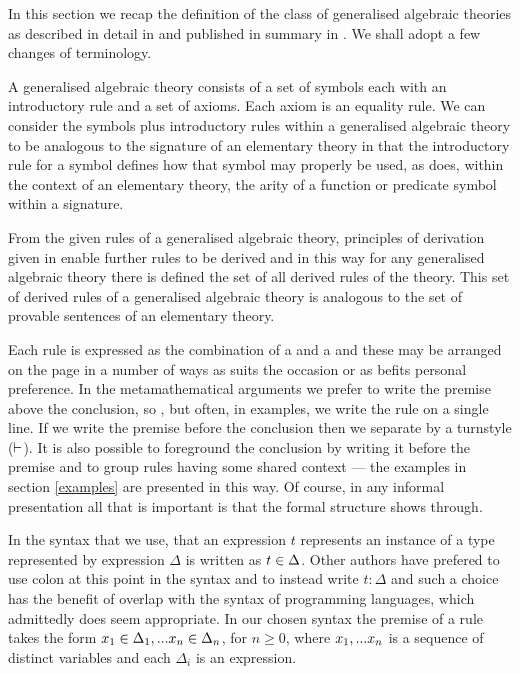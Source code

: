 \label{generalisedalgrbraictheories}

In this section we recap the definition  of the class of generalised algebraic theories 
as described in detail in \cite{Cartmell78}  and published in summary in \cite{Cartmell86}.
We shall adopt a few changes of terminology.

A generalised algebraic theory consists of a set of symbols each with an introductory rule and a set of axioms. 
Each axiom is an equality rule. We can consider the symbols plus introductory rules within a generalised algebraic theory to be analogous to the signature of an elementary theory in that
the introductory rule for a symbol defines how that symbol may properly be used, as does, within the context of an elementary theory, the arity of a function or predicate symbol within a signature.

From the given rules of a generalised algebraic theory, 
principles of derivation given in \cite{Cartmell86} enable further rules
to be derived and in this way for any generalised algebraic theory 
there is defined the set of all derived rules of the theory. 
This set of derived rules of a generalised algebraic theory is analogous to the set of provable sentences of an elementary theory.
  
Each rule is expressed as the combination of a   and a  
and these may be arranged on the page in a number of ways as suits the occasion or as befits personal preference. 
In the metamathematical arguments we prefer to write the premise above the conclusion, 
so , but often, in examples, we write  the rule on a single line. 
If we write the premise before the conclusion then we separate by a turnstyle ($\vdash$). 
It is also possible to foreground the conclusion by writing it before the premise and to group rules having some shared context --- the 
examples in section \ref{examples} are presented in this way.
Of course, in any informal presentation all that is important is that the formal structure shows through.  

In the syntax that we use,  that an expression $t$ represents an instance of a type represented by expression $\Delta$ is written as $t \in \Delta$. Other authors have prefered to use colon at this point in the syntax  and to instead write $t:\Delta$ and such a choice has the benefit of overlap with the syntax
of programming languages, which admittedly does seem appropriate. In our chosen  syntax 
the premise of a rule  takes the form $x_1 \in \Delta_1,... x_{n} \in \Delta_{n}$, for $n \geq 0$, where $x_1,...x_n$ is a sequence of distinct variables and each $\Delta_i$ is an expression.


